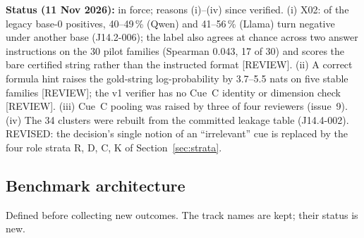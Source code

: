 \documentclass[10pt,a4paper]{article}
\newcommand{\tg}[1]{\textsc{[#1]}}
\begin{document}
\textbf{Status (11 Nov 2026):} in force; reasons (i)--(iv) since verified. (i) X02: of the legacy base-0
positives, 40--49\,\% (Qwen) and 41--56\,\% (Llama) turn negative under another base (J14.2-006); the label also
agrees at chance across two answer instructions on the 30 pilot families (Spearman 0.043, 17 of 30) and scores
the bare certified string rather than the instructed format \tg{REVIEW}. (ii) A correct formula hint raises the
gold-string log-probability by 3.7--5.5 nats on five stable families \tg{REVIEW}; the v1 verifier has no Cue~C
identity or dimension check \tg{REVIEW}. (iii) Cue~C pooling was raised by three of four reviewers (issue~9).
(iv) The 34 clusters were rebuilt from the committed leakage table (J14.4-002). REVISED: the decision's single
notion of an ``irrelevant'' cue is replaced by the four role strata R, D, C, K of Section~\ref{sec:strata}.

\subsection{Benchmark architecture}\label{sec:phaseB-tracks}

Defined before collecting new outcomes. The track names are kept; their status is new.
\end{document}
